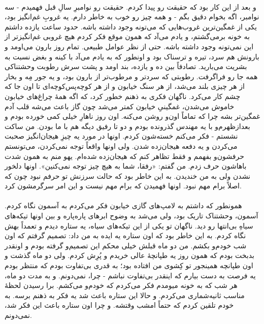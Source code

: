 \documentclass[12pt]{book}
\begin{document}
    \paragraph{}
    و بعد از این کار بود که حقیقت رو پیدا کردم. حقیقت رو نوامبرِ سالِ قبل فهمیدم - سه نوامبر، اگه بخوام دقیق بگم - و همه چیز رو خوب به خاطر دارم. یه غروبِ غم‌انگیز بود، یکی از غمگین‌ترین غروب‌هایی که می‌تونه وجود داشته باشه. حدود ساعت یازده داشتم به خونه برمی‌گشتم، و یادم می‌آد که همون موقع فکر کردم هیچ غروبی غم‌انگیزتر از این نمی‌تونه وجود داشته باشه. حتی از نظر عوامل طبیعی. تمام روز بارون می‌اومد و بارونش هم سرد، تیره و ترسناک بود و اونطور که به یادم می‌آد با کینه و بغض نسبت به بشریت می‌بارید. تصادفاً بین ده و یازده، بند اومد و پشت سرش رطوبت وحشتناکی همه جا رو فراگرفت. رطوبتی که سردتر و مرطوب‌تر از بارون بود، و یه جور مِه و بخار از هر چیزی بلند می‌شد، از هر سنگ خیابون و از هر کوچه‌پس‌کوچه‌ای تا اون جا که چشم کار می‌کرد. ناگهان فکری به ذهنم خطور کرد، که اگه همهٔ چراغ‌های خیابون خاموش می‌شدن، غمگینیِ خیابون کمتر می‌شد چون گاز باعث می‌شه قلب آدم غمگین‌تر بشه چرا که تماماً اون‌و روشن می‌کنه. اون روز ناهارِ خیلی کمی خورده بودم و بعدازظهرم‌و با یه مهندس گذرونده بودم و دو تا رفیق دیگه هم با ما بودن. من ساکت نشستم - فکر می‌کنم خسته‌شون کردم. اونها در مورد یه چیزِ هیجان‌انگیز صحبت می‌کردن و یه دفعه هیجان‌زده شدن. ولی اونها واقعاً توجه نمی‌کردن، می‌تونستم حرفشون‌و بفهمم و فقط تظاهر کنم که هیجان‌زده شده‌ام. یهو منم به همون شدت باهاشون حرف زدم. من گفتم: «رفقا، شما به هیچ چیز توجه نمی‌کنین». اونها دلخور نشدن ولی به من خندیدن. به این خاطر بود که حالت سرزنش تو حرفم نبود چون که اصلاً برام مهم نبود. اونها فهمیدن که برام مهم نیست و این امر سرگرمشون کرد.

    \paragraph{}
    همونطور که داشتم به لامپ‌های گازی خیابون فکر می‌کردم به آسمون نگاه کردم. آسمون، وحشتناک تاریک بود، ولی می‌شد به وضوح ابرهای پاره‌پاره و بین اونها تیکه‌های سیاهِ بی‌انتها رو دید. ناگهان تو یکی از این تیکه‌های سیاه، یه ستاره دیدم و تعمداً بهش نگاه کردم. به این خاطر بود که اون ستاره یه ایده به من داد: تصمیم گرفتم که اون شب خودم‌و بکشم. من دو ماه قبلش خیلی محکم این تصمیم‌و گرفته بودم و اونقدر بدبخت بودم که همون روز یه طپانچهٔ عالی خریدم و پُرِش کردم. ولی دو ماه گذشت و اون طپانچه همینجور تو کِشوی من افتاده بود؛ به قدری بی‌تفاوت بودم که منتظر بودم یه فرصت به دست بیارم که اینقدر بی‌تفاوت نباشم - چرا، نمی‌دونم. و به مدت دو ماه، هر شب که به خونه میومدم فکر می‌کردم که خودم‌و می‌کشم. برا رسیدن لحظهٔ مناسب ثانیه‌شماری می‌کردم. و حالا این ستاره باعث شد یه فکر به ذهنم برسه. به خودم تلقین کردم که حتماً امشب وقتشه. و چرا اون ستاره باعث این فکر شد، نمی‌دونم.
\end{document}
